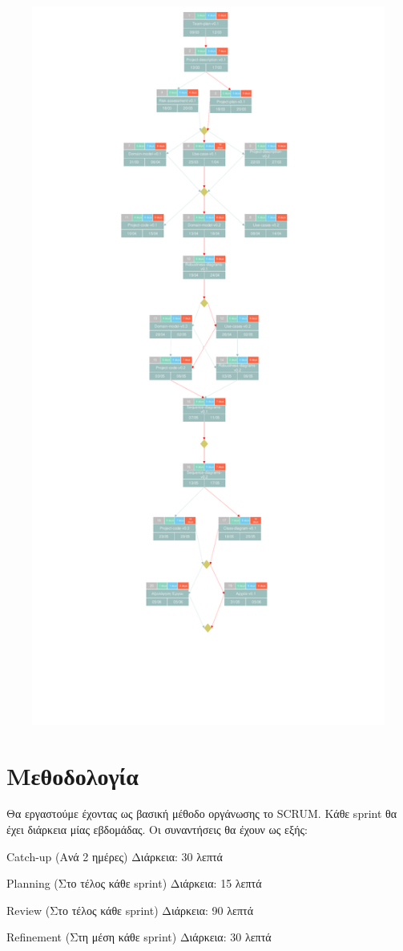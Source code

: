 \documentclass[12pt,a4paper,oneside]{article}
\begin{document}
 
\centerline{\includegraphics[width=17cm,height=23.7cm]{second try ΤΛ pert chart.pdf}}


\newpage 
\section{Μεθοδολογία}\label{sec:meth}

Θα εργαστούμε έχοντας ως βασική μέθοδο οργάνωσης το SCRUM. Κάθε sprint θα έχει διάρκεια μίας εβδομάδας. Οι συναντήσεις θα έχουν ως  εξής: 
 \begin{center}
Catch-up (Ανά 2 ημέρες) Διάρκεια: 30 λεπτά 

Planning (Στο τέλος κάθε sprint) Διάρκεια: 15 λεπτά 

Review (Στο τέλος κάθε sprint) Διάρκεια: 90 λεπτά 

Refinement (Στη μέση κάθε sprint) Διάρκεια: 30 λεπτά 
\end{center}
 
\end{document}
